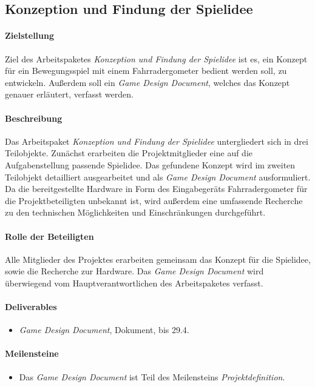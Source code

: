 \subsection{Konzeption und Findung der Spielidee}

\paragraph{Zielstellung}\noindent
Ziel des Arbeitspaketes \textit{Konzeption und Findung der Spielidee} ist es, ein Konzept für ein Bewegungsspiel mit einem Fahrradergometer bedient werden soll, zu entwickeln. Außerdem soll ein \textit{Game Design Document}, welches das Konzept genauer erläutert, verfasst werden.

\paragraph{Beschreibung}\noindent
Das Arbeitspaket \textit{Konzeption und Findung der Spielidee} untergliedert sich in drei Teilobjekte. Zunächst erarbeiten die Projektmitglieder eine auf die Aufgabenstellung passende Spielidee. Das gefundene Konzept wird im zweiten Teilobjekt detailliert ausgearbeitet und als \textit{Game Design Document} ausformuliert. Da die bereitgestellte Hardware in Form des Eingabegeräts Fahrradergometer für die Projektbeteiligten unbekannt ist, wird außerdem eine umfassende Recherche zu den technischen Möglichkeiten und Einschränkungen durchgeführt. 

\paragraph{Rolle der Beteiligten}\noindent
Alle Mitglieder des Projektes erarbeiten gemeinsam das Konzept für die Spielidee, sowie die Recherche zur Hardware. Das \textit{Game Design Document} wird überwiegend vom Hauptverantwortlichen des Arbeitspaketes verfasst.

\paragraph{Deliverables}\noindent
\begin{itemize}
\item \textit{Game Design Document}, Dokument, bis 29.4.
\end{itemize}

\paragraph{Meilensteine}\noindent
\begin{itemize}
\item Das \textit{Game Design Document} ist Teil des Meilensteins \textit{Projektdefinition}.
\end{itemize}